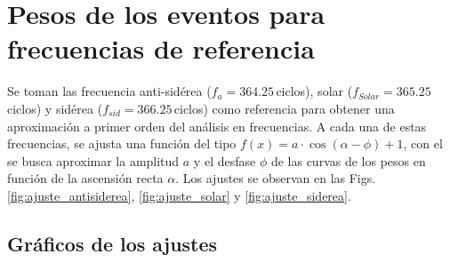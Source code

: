 \section{Pesos de los eventos para frecuencias de referencia}

Se toman las frecuencia anti-sidérea ($f_a=364.25\,$ciclos), solar ($f_{Solar}= 365.25\,$ciclos) y sidérea ($f_{sid}= 366.25\,$ciclos) como referencia para obtener una aproximación a primer orden del análisis en frecuencias. A cada una de estas frecuencias, se ajusta una función del tipo  $f(x)=a\cdot \cos{(\alpha-\phi)} + 1$, con el se busca aproximar la amplitud $a$ y el desfase $\phi$ de las curvas de los pesos en función de la ascensión recta $\alpha$. Los ajustes se observan en las Figs. \ref{fig:ajuste_antisiderea}, \ref{fig:ajuste_solar} y \ref{fig:ajuste_siderea}.


\subsection{Gráficos de los ajustes}


